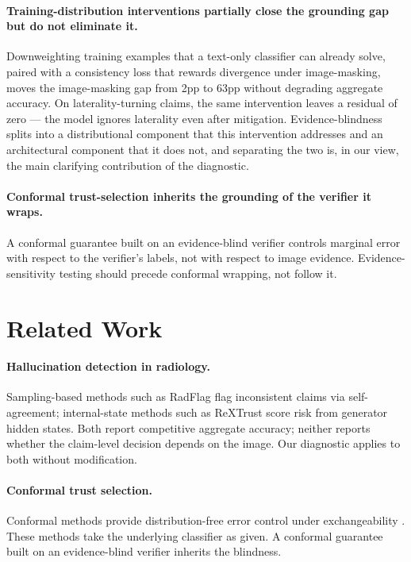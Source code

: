 \documentclass[pmlr]{jmlr}
\begin{document}
\paragraph{Training-distribution interventions partially close the grounding gap but do not eliminate it.} Downweighting training examples that a text-only classifier can already solve, paired with a consistency loss that rewards divergence under image-masking, moves the image-masking gap from 2pp to 63pp without degrading aggregate accuracy. On laterality-turning claims, the same intervention leaves a residual of zero — the model ignores laterality even after mitigation. Evidence-blindness splits into a distributional component that this intervention addresses and an architectural component that it does not, and separating the two is, in our view, the main clarifying contribution of the diagnostic.

\paragraph{Conformal trust-selection inherits the grounding of the verifier it wraps.} A conformal guarantee built on an evidence-blind verifier controls marginal error with respect to the verifier's labels, not with respect to image evidence. Evidence-sensitivity testing should precede conformal wrapping, not follow it.

\section{Related Work}

\paragraph{Hallucination detection in radiology.} Sampling-based methods such as RadFlag \citep{zhang2024radflag} flag inconsistent claims via self-agreement; internal-state methods such as ReXTrust \citep{hardy2024rextrust} score risk from generator hidden states. Both report competitive aggregate accuracy; neither reports whether the claim-level decision depends on the image. Our diagnostic applies to both without modification.

\paragraph{Conformal trust selection.} Conformal methods provide distribution-free error control under exchangeability \citep{mohri2024language,angelopoulos2021gentle}. These methods take the underlying classifier as given. A conformal guarantee built on an evidence-blind verifier inherits the blindness.
\end{document}
